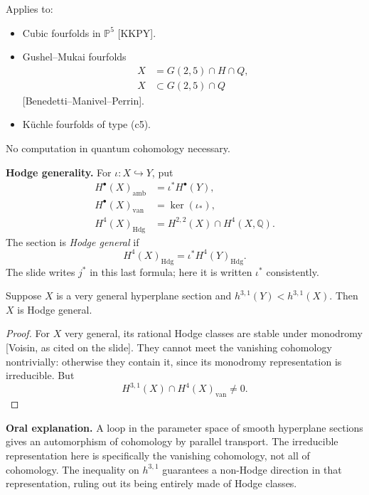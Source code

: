 Applies to:
\begin{itemize}
\item Cubic fourfolds in $\mathbb P^5$
[KKPY].
\item Gushel--Mukai fourfolds
$$
\begin{aligned}
X&=G(2,5)\cap H\cap Q,\\
X&\subset G(2,5)\cap Q
\end{aligned}
$$
[Benedetti--Manivel--Perrin].
\item K\"uchle fourfolds of type (c5).
\end{itemize}
No computation in quantum cohomology
necessary.

\medskip\noindent
\textbf{Hodge generality.}
For $\iota:X\hookrightarrow Y$, put
$$
\begin{aligned}
H^\bullet(X)_{\mathrm{amb}}
&=\iota^*H^\bullet(Y),\\
H^\bullet(X)_{\mathrm{van}}
&=\ker(\iota_*),\\
H^4(X)_{\mathrm{Hdg}}
&=H^{2,2}(X)\cap H^4(X,\mathbb Q).
\end{aligned}
$$
The section is \emph{Hodge general} if
$$
H^4(X)_{\mathrm{Hdg}}
=\iota^*H^4(Y)_{\mathrm{Hdg}}.
$$
The slide writes $j^*$ in this last formula;
here it is written $\iota^*$ consistently.

\begin{proposition}[As presented]
\label{proposition-vbac-hodge-general}
Suppose $X$ is a very general hyperplane
section and $h^{3,1}(Y)<h^{3,1}(X)$.
Then $X$ is Hodge general.
\end{proposition}
\begin{proof}
For $X$ very general, its rational Hodge
classes are stable under monodromy
[Voisin, as cited on the slide].
They cannot meet the vanishing cohomology
nontrivially: otherwise they contain it,
since its monodromy representation is
irreducible. But
$$
H^{3,1}(X)\cap H^4(X)_{\mathrm{van}}
\neq0.
$$
\end{proof}

\textbf{Oral explanation.}
A loop in the parameter space of smooth
hyperplane sections gives an automorphism
of cohomology by parallel transport.
The irreducible representation here is
specifically the vanishing cohomology, not
all of cohomology. The inequality on
$h^{3,1}$ guarantees a non-Hodge direction
in that representation, ruling out its
being entirely made of Hodge classes.

